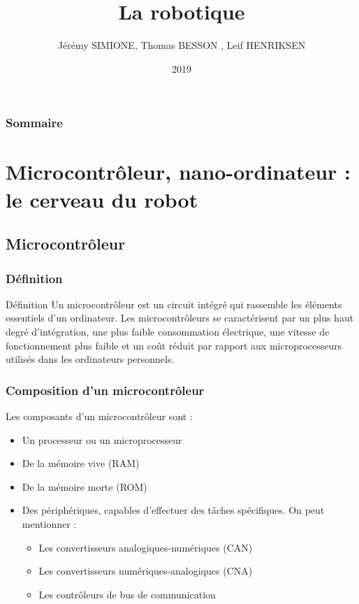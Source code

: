 \documentclass{beamer}
\title{La robotique}
\author{Jérémy SIMIONE, Thomas BESSON , Leif HENRIKSEN}
\institute{Université de Montpellier}
\date{2019}
\begin{document}
\begin{frame}
  \titlepage
\end{frame}

\begin{frame}
  \frametitle{Sommaire}
  {\small \tableofcontents}
\end{frame}

\section{Microcontrôleur, nano-ordinateur : le cerveau du robot}
\subsection{ Microcontrôleur}
\begin{frame}
\frametitle{Définition}
\begin{block}{Définition}
Un microcontrôleur est un circuit intégré qui rassemble les éléments essentiels d'un ordinateur.
 Les microcontrôleurs se caractérisent par un plus haut degré d'intégration, une plus faible consommation électrique,
 une vitesse de fonctionnement plus faible  et un coût réduit par rapport aux microprocesseurs  utilisés dans les ordinateurs personnels. 
\end{block}
\end{frame}
\begin{frame}
\frametitle{Composition d'un microcontrôleur}
  Les composants d'un microcontrôleur sont :
  \begin{itemize}
      \item Un processeur ou un microprocesseur 
      \item De la mémoire vive (RAM) 
      \item De la mémoire morte (ROM) 	
      \item Des périphériques, capables d'effectuer des tâches spécifiques. On peut mentionner  :
		\begin{itemize}
   			\item Les convertisseurs analogiques-numériques (CAN) 
 			  \item Les convertisseurs numériques-analogiques (CNA) 
 			  \item Les contrôleurs de bus de communication
		\end{itemize} 
  \end{itemize}
\end{frame}
\end{document}
